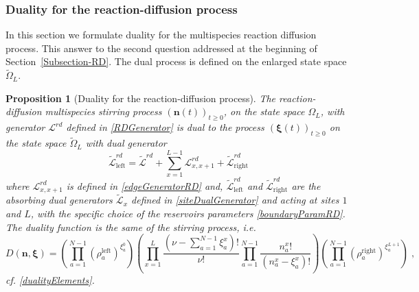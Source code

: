 \documentclass[10pt]{article}
\numberwithin{equation}{section}
\numberwithin{equation}{subsection}
\newtheorem{proposition}{Proposition}
\newcommand{\co}{\;,}
\begin{document}
\subsubsection{Duality for the reaction-diffusion process}
In this section we formulate duality for the multispecies reaction diffusion process. This answer to the second question addressed at the beginning of Section~\ref{Subsection-RD}.  The dual process is defined on the enlarged state space $\widetilde{\Omega}_{L}$.  
\begin{proposition}[Duality for the reaction-diffusion process]\label{propositin-duality-RD}
The reaction-diffusion multispecies stirring process $(\bm{n}(t))_{t\geq 0}$, on the state space $\Omega_{L}$, with generator $\mathcal{L}^{rd}$ defined in \eqref{RDGenerator} is dual to the process $(\bm{\xi}(t))_{t\geq 0}$ on the state space $\widetilde{\Omega}_{L}$ with dual generator
\begin{equation}\label{DualGeneratorRD}
	\widetilde{\mathcal{L}}_{\text{left}}^{rd}=\widetilde{\mathcal{L}}^{rd}+\sum_{x=1}^{L-1}\mathcal{L}_{x,x+1}^{rd}+\widetilde{\mathcal{L}}_{\text{right}}^{rd}
\end{equation}
where 
$\mathcal{L}_{x,x+1}^{rd}$ is defined in \eqref{edgeGeneratorRD} and, $\widetilde{\mathcal{L}}_{\text{left}}^{rd}$ and $\widetilde{\mathcal{L}}_{\text{right}}^{rd}$ are the absorbing dual generators $\widetilde{\mathcal{L}}_{x}$ defined in \eqref{siteDualGenerator} and acting at sites $1$ and $L$, with the specific choice of the reservoirs parameters \eqref{boundaryParamRD}. The duality function
is the same of the stirring process, i.e.
\begin{equation}
	D(\bm{n},\bm{\xi})=\left(\prod_{a=1}^{N-1}\left(\rho_{a}^{\text{left}}\right)^{\xi_{a}^{0}}\right)\left(\prod_{x=1}^{L}\frac{(\nu -\sum_{a=1}^{N-1}\xi_{a}^{x})!}{\nu!}\prod_{a=1}^{N-1}\frac{n_{a}^{x}!}{(n_{a}^{x}-\xi_{a}^{x})!}\right)\left(\prod_{a=1}^{N-1}\left(\rho_{a}^{\text{right}}\right)^{\xi_{a}^{L+1}}\right)\co
\end{equation}
cf. \eqref{dualityElements}.
\end{proposition} 
\end{document}
